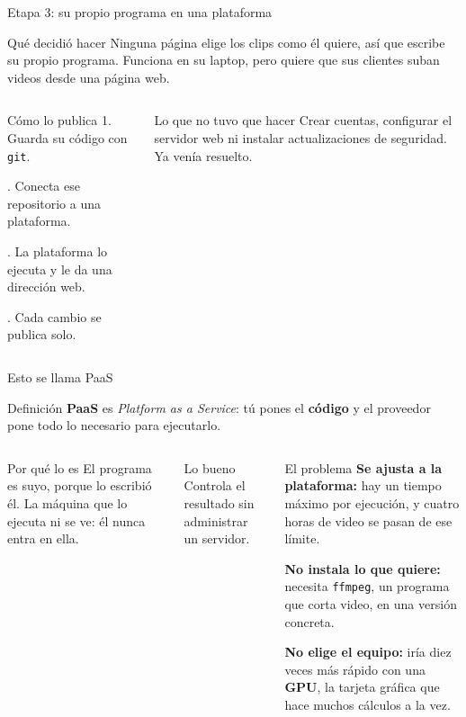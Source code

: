 \documentclass[aspectratio=169,10pt,c]{beamer}
\begin{document}
\begin{frame}{Etapa 3: su propio programa en una plataforma}
\begin{block}{Qué decidió hacer}
\small Ninguna página elige los clips como él quiere, así que escribe su propio programa. Funciona en su laptop, pero quiere que sus clientes suban videos desde una página web.
\end{block}
\begin{columns}[T,onlytextwidth]
\begin{exampleblock}{Cómo lo publica}
\small
1. Guarda su código con \texttt{git}.\par{}. Conecta ese repositorio a una plataforma.\par{}. La plataforma lo ejecuta y le da una dirección web.\par{}. Cada cambio se publica solo.
\end{exampleblock}
\begin{block}{Lo que no tuvo que hacer}
\small Crear cuentas, configurar el servidor web ni instalar actualizaciones de seguridad. Ya venía resuelto.
\end{block}
\end{columns}
\end{frame}

\begin{frame}{Esto se llama PaaS}
\begin{block}{Definición}
\small \textbf{PaaS} es \emph{Platform as a Service}: tú pones el \textbf{código} y el proveedor pone todo lo necesario para ejecutarlo.
\end{block}
\begin{columns}[T,onlytextwidth]
\begin{exampleblock}{Por qué lo es}
\small El programa es suyo, porque lo escribió él. La máquina que lo ejecuta ni se ve: él nunca entra en ella.
\end{exampleblock}
\begin{block}{Lo bueno}
\small Controla el resultado sin administrar un servidor.
\end{block}
\begin{alertblock}{El problema}
\small
\textbf{Se ajusta a la plataforma:} hay un tiempo máximo por ejecución, y cuatro horas de video se pasan de ese límite.\par\smallskip
\textbf{No instala lo que quiere:} necesita \texttt{ffmpeg}, un programa que corta video, en una versión concreta.\par\smallskip
\textbf{No elige el equipo:} iría diez veces más rápido con una \textbf{GPU}, la tarjeta gráfica que hace muchos cálculos a la vez.
\end{alertblock}
\end{columns}
\end{frame}
\end{document}
